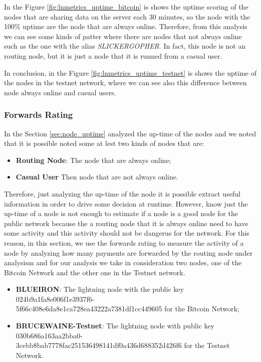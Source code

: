 In the Figure \ref{fig:lnmetrics_uptime_bitcoin} is shows the uptime scoring of the nodes that 
are sharing data on the server each 30 minutes, so the node with the 100\% uptime 
are the node that are always online. Therefore, from this analysis we can 
see some kinds of patter where there are nodes that not always online such as the one 
with the alias \emph{SLICKERGOPHER}. In fact, 
this node is not an routing node, but it is just a node that it is runned from a casual user.

In conclusion, in the Figure \ref{fig:lnmetrics_uptime_testnet} is
shows the uptime of the nodes in the testnet network, where we can see also 
this difference between node always online and casual users.

\subsubsection{Forwards Rating}

In the Section \ref{sec:node_uptime} analyzed the up-time of the nodes and we 
noted that it is possible noted some at lest two kinds of nodes that are: 

\begin{itemize}
    \item {\bf Routing Node}: The node that are always online;
    \item {\bf Casual User} Then node that are not always online.
\end{itemize}

Therefore, just analyzing the up-time of the node it is possible extract useful information 
in order to drive some decision at runtime. However, know just the 
up-time of a node is not enough to estimate if a node is a good node for the public network 
because the a routing node that it is always online need to have some activity and this activity 
should not be dangerus for the network.
For this reason, in this section, we use the forwards rating to measure the activity of a node 
by analyzing how many payments are forwarded by the routing node under analysism and for our analysis 
we take in consideration two nodes, one of the Bitcoin Network and the other one in the Testnet network.

\begin{itemize}
    \item {\bf BLUEIRON}: The lightning node with the public key 024b9a1fa8e006f1e3937f6-\\5f66c408e6da8e1ca728ea43222a7381df1cc449605 for the Bitcoin Network;
    \item {\bf BRUCEWAINE-Testnet}: The lightning node with public key 030b686a163aa2bba0-\\3cebb8bab7778fac251536498141df0a436d688352d426f6 for the Testnet Network.
\end{itemize}

